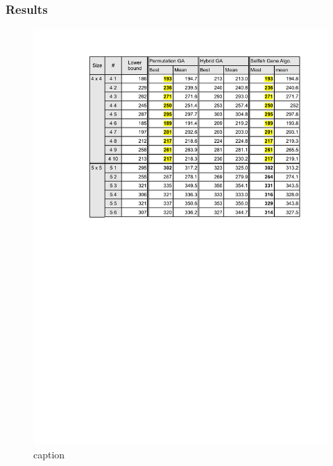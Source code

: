 \begin{frame}
  \frametitle{Results}
\begin{figure}[htbp]
	\centering
		\includegraphics[scale=.5]{images/results1.pdf}
	\caption{caption}
	\label{fig:label}
\end{figure}
\end{frame}


